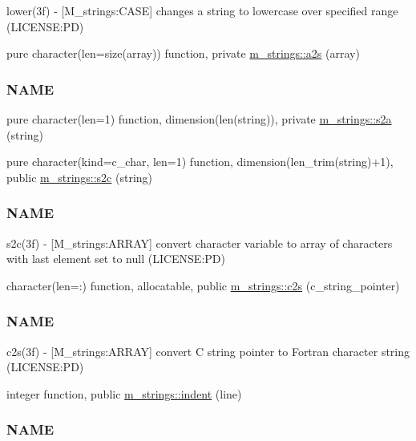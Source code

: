 \begin{DoxyCompactItemize}
\begin{DoxyCompactList}
lower(3f) -\/ \mbox{[}M\+\_\+strings\+:C\+A\+SE\mbox{]} changes a string to lowercase over specified range (L\+I\+C\+E\+N\+SE\+:PD) \end{DoxyCompactList}\item 
pure character(len=size(array)) function, private \mbox{\hyperlink{namespacem__strings_a9365ae5277199446d93fc5208be2e9a5}{m\+\_\+strings\+::a2s}} (array)
\begin{DoxyCompactList}\small\item\em \subsubsection*{N\+A\+ME}\end{DoxyCompactList}\item 
pure character(len=1) function, dimension(len(string)), private \mbox{\hyperlink{namespacem__strings_a5b05f337c8851871a4fb0b3cf56663cd}{m\+\_\+strings\+::s2a}} (string)
\item 
pure character(kind=c\+\_\+char, len=1) function, dimension(len\+\_\+trim(string)+1), public \mbox{\hyperlink{namespacem__strings_a9a3d38d8e7c4212d63487b9b46bec3b7}{m\+\_\+strings\+::s2c}} (string)
\begin{DoxyCompactList}\small\item\em \subsubsection*{N\+A\+ME}

s2c(3f) -\/ \mbox{[}M\+\_\+strings\+:A\+R\+R\+AY\mbox{]} convert character variable to array of characters with last element set to null (L\+I\+C\+E\+N\+SE\+:PD) \end{DoxyCompactList}\item 
character(len=\+:) function, allocatable, public \mbox{\hyperlink{namespacem__strings_a0a8c0c16a34208351523068686cb743b}{m\+\_\+strings\+::c2s}} (c\+\_\+string\+\_\+pointer)
\begin{DoxyCompactList}\small\item\em \subsubsection*{N\+A\+ME}

c2s(3f) -\/ \mbox{[}M\+\_\+strings\+:A\+R\+R\+AY\mbox{]} convert C string pointer to Fortran character string (L\+I\+C\+E\+N\+SE\+:PD) \end{DoxyCompactList}\item 
integer function, public \mbox{\hyperlink{namespacem__strings_a020dcca7f01d33eedf28b17518a22b69}{m\+\_\+strings\+::indent}} (line)
\begin{DoxyCompactList}\small\item\em \subsubsection*{N\+A\+ME}


\end{DoxyCompactList}
\end{DoxyCompactItemize}
